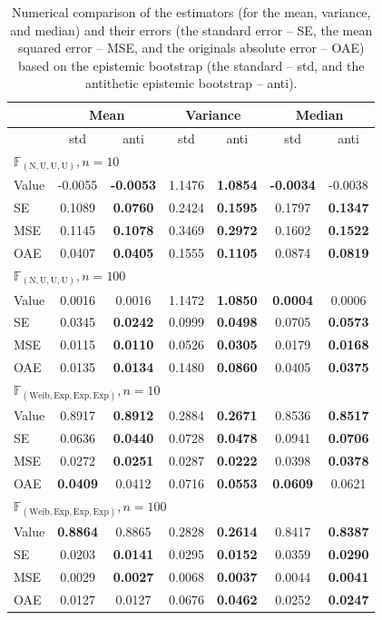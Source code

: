 \begin{table}[htbp]
\centering
\begin{tabular}{l|cc|cc|cc}
\hline
 & \multicolumn{2}{c|}{Mean} & \multicolumn{2}{c|}{Variance} & \multicolumn{2}{c}{Median} \\
  \hline
 & std & anti & std & anti & std & anti \\ 
  \hline
\multicolumn{7}{l}{$\mathbb{F}_{(\mathrm{N,U,U,U})}, n=10$} \\
  \hline
Value & -0.0055 & \textbf{-0.0053} & 1.1476 & \textbf{1.0854} & \textbf{-0.0034} & -0.0038 \\ 
  SE & 0.1089 & \textbf{0.0760} & 0.2424 & \textbf{0.1595} & 0.1797 & \textbf{0.1347} \\ 
  MSE & 0.1145 & \textbf{0.1078} & 0.3469 & \textbf{0.2972} & 0.1602 & \textbf{0.1522} \\ 
  OAE & 0.0407 & \textbf{0.0405} & 0.1555 & \textbf{0.1105} & 0.0874 & \textbf{0.0819} \\
   \hline
\multicolumn{7}{l}{$\mathbb{F}_{(\mathrm{N,U,U,U})}, n=100$} \\
  \hline
Value & 0.0016 & 0.0016 & 1.1472 & \textbf{1.0850} & \textbf{0.0004} & 0.0006 \\ 
  SE & 0.0345 & \textbf{0.0242} & 0.0999 & \textbf{0.0498} & 0.0705 & \textbf{0.0573} \\ 
  MSE & 0.0115 & \textbf{0.0110} & 0.0526 & \textbf{0.0305} & 0.0179 & \textbf{0.0168} \\ 
  OAE & 0.0135 & \textbf{0.0134} & 0.1480 & \textbf{0.0860} & 0.0405 & \textbf{0.0375} \\ 
  \hline
\multicolumn{7}{l}{$\mathbb{F}_{(\mathrm{Weib,Exp,Exp,Exp})}, n=10$} \\
  \hline
Value & 0.8917 & \textbf{0.8912} & 0.2884 & \textbf{0.2671} & 0.8536 & \textbf{0.8517} \\ 
  SE & 0.0636 & \textbf{0.0440} & 0.0728 & \textbf{0.0478} & 0.0941 & \textbf{0.0706} \\ 
  MSE & 0.0272 & \textbf{0.0251} & 0.0287 & \textbf{0.0222} & 0.0398 & \textbf{0.0378} \\ 
  OAE & \textbf{0.0409} & 0.0412 & 0.0716 & \textbf{0.0553} & \textbf{0.0609} & 0.0621 \\ 
  \hline
\multicolumn{7}{l}{$\mathbb{F}_{(\mathrm{Weib,Exp,Exp,Exp})}, n=100$} \\
  \hline
Value & \textbf{0.8864} & 0.8865 & 0.2828 & \textbf{0.2614} & 0.8417 & \textbf{0.8387} \\ 
  SE & 0.0203 & \textbf{0.0141} & 0.0295 & \textbf{0.0152} & 0.0359 & \textbf{0.0290} \\ 
  MSE & 0.0029 & \textbf{0.0027} & 0.0068 & \textbf{0.0037} & 0.0044 & \textbf{0.0041} \\ 
  OAE & 0.0127 & 0.0127 & 0.0676 & \textbf{0.0462} & 0.0252 & \textbf{0.0247} \\ 
   \hline
\end{tabular}
\caption{Numerical comparison of the estimators (for the mean, variance, and median) and their errors (the standard error -- SE, the mean squared error -- MSE, and the originals absolute error -- OAE) based on the epistemic bootstrap (the standard -- std, and the antithetic epistemic bootstrap -- anti).}\label{tab200}
\end{table}
